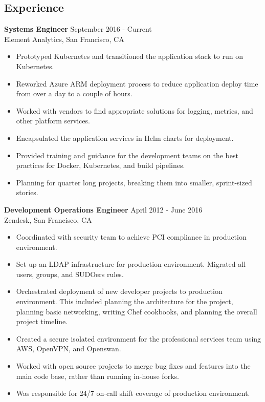 \documentclass[12pt,line,letterpaper]{res}
\begin{document}
\address{968 Washington St Apt 4, San Francisco, CA}
\address{aaron.peschel@gmail.com or (760)-791-7301}

\begin{resume}
\pagestyle{empty}
\section{Experience}
    {\bf Systems Engineer} \hfill September 2016 - Current \\
    Element Analytics, San Francisco, CA
    \begin{itemize} \itemsep -2pt
    \item Prototyped Kubernetes and transitioned the application stack to run on Kubernetes.
    \item Reworked Azure ARM deployment process to reduce application deploy time from over a day to a couple of hours.
    \item Worked with vendors to find appropriate solutions for logging, metrics, and other platform services.
    \item Encapsulated the application services in Helm charts for deployment.
    \item Provided training and guidance for the development teams on the best practices for Docker, Kubernetes, and build pipelines.
    \item Planning for quarter long projects, breaking them into smaller, sprint-sized stories.
    \end{itemize}

    {\bf Development Operations Engineer} \hfill April 2012 - June 2016 \\
    Zendesk, San Francisco, CA
    \begin{itemize} \itemsep -2pt
    \item Coordinated with security team to achieve PCI compliance in production environment.
    \item Set up an LDAP infrastructure for production environment. Migrated all users, groups, and SUDOers rules.
    \item Orchestrated deployment of new developer projects to production environment. This included planning the architecture for the project, planning basic networking, writing Chef cookbooks, and planning the overall project timeline.
    \item Created a secure isolated environment for the professional services team using AWS, OpenVPN, and Openswan.
    \item Worked with open source projects to merge bug fixes and features into the main code base, rather than running in-house forks.
    \item Was responsible for 24/7 on-call shift coverage of production environment.
    \end{itemize}


\end{resume}
\end{document}
